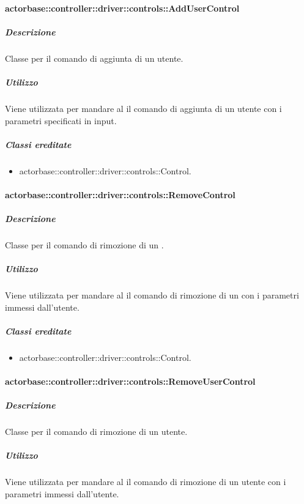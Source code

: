 \documentclass{scalatekids-article}
\begin{document}
\paragraph{actorbase::controller::driver::controls::AddUserControl}

\subparagraph{Descrizione}

Classe per il comando di aggiunta di un utente.

\subparagraph{Utilizzo}

Viene utilizzata per mandare al  il comando di aggiunta di un utente con i parametri specificati in input.

\subparagraph{Classi ereditate}

\begin{itemize}
\item actorbase::controller::driver::controls::Control.
\end{itemize}

\paragraph{actorbase::controller::driver::controls::RemoveControl}

\subparagraph{Descrizione}

Classe per il comando di rimozione di un .

\subparagraph{Utilizzo}

Viene utilizzata per mandare al  il comando di rimozione di un  con i parametri immessi dall'utente.

\subparagraph{Classi ereditate}

\begin{itemize}
\item actorbase::controller::driver::controls::Control.
\end{itemize}

\paragraph{actorbase::controller::driver::controls::RemoveUserControl}

\subparagraph{Descrizione}

Classe per il comando di rimozione di un utente.

\subparagraph{Utilizzo}

Viene utilizzata per mandare al  il comando di rimozione di un utente con i parametri immessi dall'utente.
\end{document}
